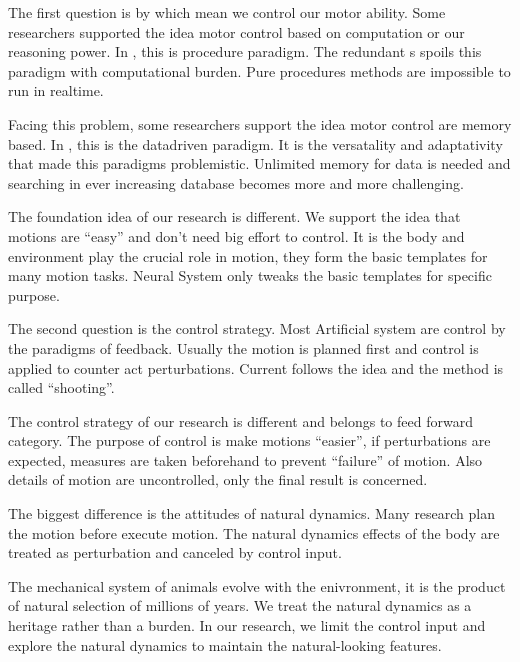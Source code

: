 \begin{itemize}
The first question is by which mean we control our motor ability.
Some researchers supported the idea motor control based on computation or our reasoning power.
In \cms , this is procedure paradigm.
The redundant {\dof}s spoils this paradigm with computational burden.
Pure procedures methods are impossible to run in realtime.

Facing this problem, some researchers support the idea motor control are memory based.
In \cms, this is the datadriven paradigm.
It is the versatality and adaptativity that made this paradigms problemistic.
Unlimited memory for data is needed and searching in ever increasing database becomes more and more challenging.

The foundation idea of our research is different.
We support the idea that motions are ``easy'' and don't need big effort to control.
It is the body and environment play the crucial role in motion, they form the basic templates for many motion tasks.
Neural System only tweaks the basic templates for specific purpose.



 
 
	
The second question is the control strategy.
Most Artificial system are control by the paradigms of feedback.
Usually the motion is planned first and control is applied to counter act perturbations.
Current \cms follows the idea and the method is called ``shooting''.


The control strategy of our research is different and belongs to feed forward category.
The purpose of control is make motions ``easier'', if perturbations are expected, measures are taken beforehand to prevent ``failure'' of motion.
Also details of motion are uncontrolled, only the final result is concerned.


The biggest difference is the attitudes of natural dynamics. 
Many \cms research plan the motion before execute motion.
The natural dynamics effects of the body are treated as perturbation and canceled by control input.


The mechanical system of animals evolve with the enivronment, it is the product of natural selection of millions of years.
We treat the natural dynamics as a heritage rather than a burden. 
In our research, we limit the control input and explore the natural dynamics to maintain the natural-looking features.
\end{itemize}


